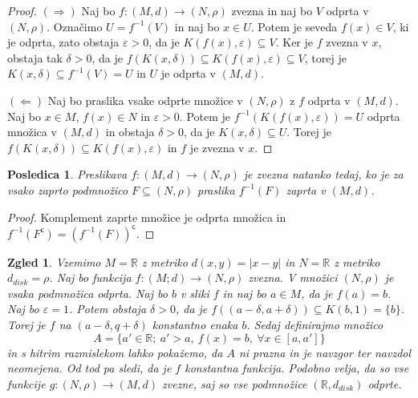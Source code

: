 \documentclass[10pt, a4paper]{article}
\newtheorem{posledica}[izr]{Posledica}
\newtheorem{zgled}[izr]{Zgled}
\newenvironment{noticeC}{%
  \tcolorbox[%
  notitle,
  empty,
  enhanced,  %
  breakable,
  coltext=black, 
  fontupper=\rmfamily,
  noparskip,
  sharp corners,
  boxrule=-1pt,  %
  frame hidden,
  left=7pt,  %
  right=7pt,
  top=5pt,
  bottom=5pt,
  before skip=2.5ex plus 2pt,
  after skip=2.5ex plus 2pt,
  overlay unbroken and last={%
  },
  ]}
{\endtcolorbox}
\newenvironment{dokaz}%
  {\begin{noticeC}\begin{proof}}%
  {\end{proof}\end{noticeC}}
\newcommand{\R}{\mathbb {R}}
\begin{document}
\begin{dokaz}
    $(\Rightarrow)$ Naj bo $f: (M, d) \rightarrow (N, \rho)$ zvezna in naj bo $V$ odprta v $(N, \rho)$.
    Označimo $U = f^{-1} (V)$ in naj bo $x \in U$.
    Potem je seveda $f(x) \in V$, ki je odprta, zato obstaja $\varepsilon > 0$, da je $K(f(x), \varepsilon) \subseteq V$.
    Ker je $f$ zvezna v $x$, obstaja tak $\delta > 0$, da je $f(K(x,\delta)) \subseteq K(f(x), \varepsilon) \subseteq V$,
    torej je $K(x, \delta) \subseteq f^{-1} (V) = U$ in $U$ je odprta v $(M, d)$.

    $(\Leftarrow)$ Naj bo praslika vsake odprte množice v $(N, \rho)$ z $f$ odprta v $(M, d)$.
    Naj bo $x \in M$, $f(x) \in N$ in $\varepsilon > 0$. Potem je $f^{-1} (K(f(x), \varepsilon)) = U$
    odprta množica v $(M, d)$ in obstaja $\delta > 0$, da je $K(x, \delta) \subseteq U$.
    Torej je $f(K(x, \delta)) \subseteq K(f(x), \varepsilon)$ in $f$ je zvezna v $x$.
\end{dokaz}

\begin{posledica}
    Preslikava $f: (M, d) \rightarrow (N, \rho)$ je zvezna natanko tedaj, ko je za vsako zaprto podmnožico $F \subseteq (N, \rho)$
    praslika $f^{-1} (F)$ zaprta v $(M, d)$.
\end{posledica}

\begin{dokaz}
    Komplement zaprte množice je odprta množica in $f^{-1} (F^\mathsf{c}) = \left(f^{-1} (F)\right)^\mathsf{c}$.
\end{dokaz}

\begin{zgled}
    Vzemimo $M = \R$ z metriko $d(x,y) = |x-y|$ in $N = \R$ z metriko $d_{disk} = \rho$.
    Naj bo funkcija $f:(M; d) \rightarrow (N, \rho)$ zvezna.
    V množici $(N, \rho)$ je vsaka podmnožica odprta.
    Naj bo $b$ v sliki $f$ in naj bo $a \in M$, da je $f(a) = b$.
    Naj bo $\varepsilon = 1$.
    Potem obstaja $\delta > 0$, da je $f((a-\delta, a+ \delta)) \subseteq K(b, 1) = \{b\}$.
    Torej je $f$ na $(a- \delta, q + \delta)$ konstantno enaka $b$.
    Sedaj definirajmo množico 
    $$A = \{a' \in \R;\ a' > a,\ f(x) = b,\ \forall x \in [a, a']\}$$
    in s hitrim razmislekom lahko pokažemo, da $A$ ni prazna in je navzgor ter navzdol neomejena.
    Od tod pa sledi, da je $f$ konstantna funkcija.
    Podobno velja, da so vse funkcije $g: (N, \rho) \rightarrow (M, d)$ zvezne,
    saj so vse podmnožice $(\R, d_{disk})$ odprte. 
\end{zgled}
\end{document}
